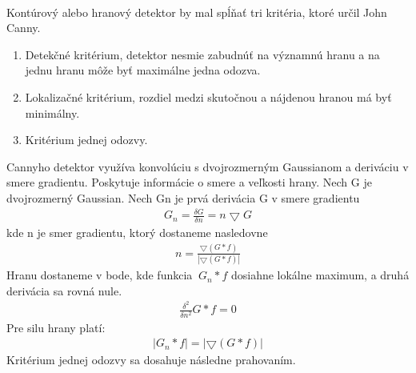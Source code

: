 \documentclass[12pt]{article}
\begin{document}
\paragraph{}
Kontúrový alebo hranový detektor by mal spĺňať tri kritéria, ktoré určil John Canny.
\begin{enumerate}
  \item Detekčné kritérium, detektor nesmie zabudnúť na významnú hranu a na jednu hranu môže byť maximálne jedna odozva.
  \item Lokalizačné kritérium, rozdiel medzi skutočnou a nájdenou hranou má byť minimálny.
  \item Kritérium jednej odozvy.
\end{enumerate}
Cannyho detektor využíva konvolúciu s dvojrozmerným Gaussianom a deriváciu v smere gradientu.
Poskytuje informácie o smere a veľkosti hrany. Nech G je dvojrozmerný Gaussian. Nech Gn je prvá derivácia G v smere gradientu
\begin{align*}
G_n = \frac{\delta G}{\delta n} = n\bigtriangledown G
\end{align*}
kde n je smer gradientu, ktorý dostaneme nasledovne
\begin{align*}
n = \frac{\bigtriangledown(G * f)}{|\bigtriangledown(G * f)|}
\end{align*}
Hranu dostaneme v bode, kde funkcia \begin{math}\ G_n *f  \end{math} dosiahne lokálne maximum, a druhá derivácia sa rovná nule.
\begin{align*}
\frac{\delta^2}{\delta n^2} G * f = 0
\end{align*}
Pre silu hrany platí:
\begin{align*}
|G_n * f| = |\bigtriangledown (G * f)|
\end{align*}
Kritérium jednej odozvy sa dosahuje následne prahovaním. 
\cite{DIP}
\cite{JCanny}
\cite{canny_wiki_en}
\end{document}
